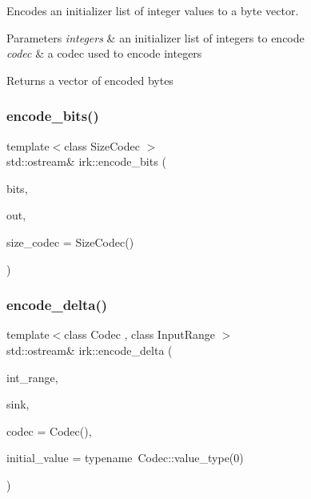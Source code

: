 Encodes an initializer list of integer values to a byte vector. 


\begin{DoxyParams}{Parameters}
{\em integers} & an initializer list of integers to encode \\
\hline
{\em codec} & a codec used to encode integers \\
\hline
\end{DoxyParams}
\begin{DoxyReturn}{Returns}
a vector of encoded bytes 
\end{DoxyReturn}
\mbox{\label{namespaceirk_ad5beaa760e39ac6f6b3c001030388a6f}} 
\subsubsection{\texorpdfstring{encode\+\_\+bits()}{encode\_bits()}}
{\footnotesize\ttfamily template$<$class Size\+Codec $>$ \\
std\+::ostream\& irk\+::encode\+\_\+bits (\begin{DoxyParamCaption}\item[{const \mbox{\hyperlink{namespaceirk_a5d1a67079cf6423ecaededebe848f083}{bitword}} \&}]{bits,  }\item[{std\+::ostream \&}]{out,  }\item[{const Size\+Codec \&}]{size\+\_\+codec = {\ttfamily SizeCodec()} }\end{DoxyParamCaption})}

\mbox{\label{namespaceirk_a76d26e66fd2b02cada45345b5ca3e995}} 
\subsubsection{\texorpdfstring{encode\+\_\+delta()}{encode\_delta()}\hspace{0.1cm}{\footnotesize\ttfamily [1/2]}}
{\footnotesize\ttfamily template$<$class Codec , class Input\+Range $>$ \\
std\+::ostream\& irk\+::encode\+\_\+delta (\begin{DoxyParamCaption}\item[{const Input\+Range \&}]{int\+\_\+range,  }\item[{std\+::ostream \&}]{sink,  }\item[{const Codec \&}]{codec = {\ttfamily Codec()},  }\item[{typename Codec\+::value\+\_\+type}]{initial\+\_\+value = {\ttfamily typename~Codec\+:\+:value\+\_\+type(0)} }\end{DoxyParamCaption})}



